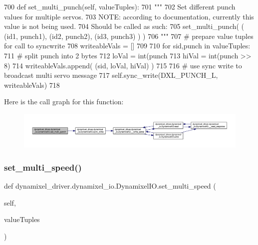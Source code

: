\begin{DoxyCode}
700     \textcolor{keyword}{def }set\_multi\_punch(self, valueTuples):
701         \textcolor{stringliteral}{"""}
702 \textcolor{stringliteral}{        Set different punch values for multiple servos.}
703 \textcolor{stringliteral}{        NOTE: according to documentation, currently this value is not being used.}
704 \textcolor{stringliteral}{        Should be called as such:}
705 \textcolor{stringliteral}{        set\_multi\_punch( ( (id1, punch1), (id2, punch2), (id3, punch3) ) )}
706 \textcolor{stringliteral}{        """}
707         \textcolor{comment}{# prepare value tuples for call to syncwrite}
708         writeableVals = []
709 
710         \textcolor{keywordflow}{for} sid,punch \textcolor{keywordflow}{in} valueTuples:
711             \textcolor{comment}{# split punch into 2 bytes}
712             loVal = int(punch %
713             hiVal = int(punch >> 8)
714             writeableVals.append( (sid, loVal, hiVal) )
715 
716         \textcolor{comment}{# use sync write to broadcast multi servo message}
717         self.sync\_write(DXL\_PUNCH\_L, writeableVals)
718 
\end{DoxyCode}
Here is the call graph for this function\+:
\nopagebreak
\begin{figure}[H]
\begin{center}
\leavevmode
\includegraphics[width=350pt]{dd/d77/classdynamixel__driver_1_1dynamixel__io_1_1_dynamixel_i_o_a113e6ff1c59d67480dc779fe7fa1ba52_cgraph}
\end{center}
\end{figure}
\mbox{\label{classdynamixel__driver_1_1dynamixel__io_1_1_dynamixel_i_o_a8150f8a015df1441f348eb0a6c6ccaee}} 
\subsubsection{\texorpdfstring{set\+\_\+multi\+\_\+speed()}{set\_multi\_speed()}}
{\footnotesize\ttfamily def dynamixel\+\_\+driver.\+dynamixel\+\_\+io.\+Dynamixel\+I\+O.\+set\+\_\+multi\+\_\+speed (\begin{DoxyParamCaption}\item[{}]{self,  }\item[{}]{value\+Tuples }\end{DoxyParamCaption})}

